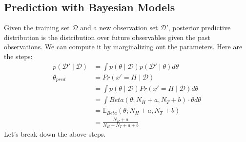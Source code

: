\documentclass{article}
\begin{document}
\subsection{Prediction with Bayesian Models}
Given the training set \( \mathcal{D}\) and a new observation set \( \mathcal{D'}\), posterior predictive distribution is the distribution over future observables given the past observations. We can compute it by marginalizing out the parameters. Here are the steps:
\begin{align*}
    p(\mathcal{D'} \mid \mathcal{D}) &= \int p(\theta \mid \mathcal{D})p(\mathcal{D'} \mid \theta ) d\theta\\
    \theta_{pred} &= Pr(x'=H \mid \mathcal{D})\\
    &= \int p(\theta \mid \mathcal{D})Pr(x'=H \mid \mathcal{D})d\theta\\
    &= \int Beta(\theta; N_H+a, N_T+b) \cdot \theta d\theta\\
    &= \mathbb{E}_{Beta}(\theta; N_H+a, N_T+b)\\
    &= \frac{N_H+a}{N_H+N_T+a+b}
\end{align*}
Let's break down the above steps.
\end{document}
